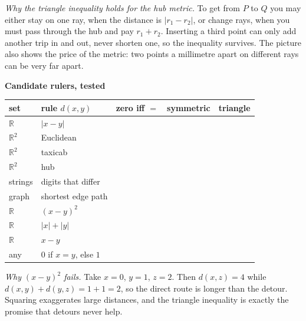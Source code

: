 \documentclass[10pt]{article}
\newcommand{\cmark}{\textcolor{why}{\ding{51}}}
\newcommand{\xmark}{\textcolor{pit}{\ding{55}}}
\newcommand{\R}{\mathbb{R}}
\begin{document}
{\begin{minipage}[t]{744pt}
\begin{minipage}[t]{368pt}
\begin{why}
\end{why}
\begin{why}
\emph{Why the triangle inequality holds for the hub metric.} To get from $P$ to $Q$ you may either stay on one ray, when the distance is $|r_1-r_2|$, or change rays, when you must pass through the hub and pay $r_1+r_2$. Inserting a third point can only add another trip in and out, never shorten one, so the inequality survives. The picture also shows the price of the metric: two points a millimetre apart on different rays can be very far apart.
\end{why}
\end{minipage}\hfill
\begin{minipage}[t]{358pt}\vspace{0pt}
{\sffamily\bfseries\color{big} Candidate rulers, tested}\par\vspace{2pt}
\centering
\begin{tabular}{@{}llccc@{}}
\toprule
set & rule $d(x,y)$ & zero iff $=$ & symmetric & triangle\\
\midrule
$\R$ & $|x-y|$ & \cmark & \cmark & \cmark\\
$\R^2$ & Euclidean & \cmark & \cmark & \cmark\\
$\R^2$ & taxicab & \cmark & \cmark & \cmark\\
$\R^2$ & hub & \cmark & \cmark & \cmark\\
strings & digits that differ & \cmark & \cmark & \cmark\\
graph & shortest edge path & \cmark & \cmark & \cmark\\
$\R$ & $(x-y)^2$ & \cmark & \cmark & \xmark\\
$\R$ & $|x|+|y|$ & \xmark & \cmark & \cmark\\
$\R$ & $x-y$ & \xmark & \xmark & \cmark\\
any & $0$ if $x=y$, else $1$ & \cmark & \cmark & \cmark\\
\bottomrule
\end{tabular}\par\vspace{3pt}
\raggedright
\begin{why}
\emph{Why $(x-y)^2$ fails.} Take $x=0$, $y=1$, $z=2$. Then $d(x,z)=4$ while $d(x,y)+d(y,z)=1+1=2$, so the direct route is longer than the detour. Squaring exaggerates large distances, and the triangle inequality is exactly the promise that detours never help.
\end{why}
\begin{pitfall}

\end{pitfall}
\end{minipage}
\end{minipage}}
\end{document}
